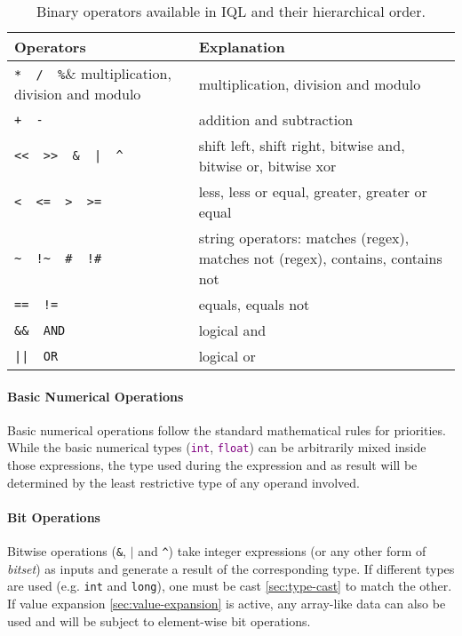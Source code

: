\documentclass[11pt,a4paper,portrait]{article}
\newcommand{\iql}{IQL\xspace}
\newcommand{\keyword}[1]{\textcolor{purple}{\texttt{#1}}}
\begin{document}
\begin{table}[ht]
\centering\begin{tabular}{|p{}|p{}|}
\hline 
Operators	& Explanation \\ 
\hline 
\hline
\verb|*  /  %|& multiplication, division and modulo \\ 
\hline 
\verb|+  -|& addition and subtraction \\ 
\hline 
\verb#<<  >>  &  |  ^#& shift left, shift right, bitwise and, bitwise or, bitwise xor \\ 
\hline 
\verb|<  <=  >  >=|& less, less or equal, greater, greater or equal \\ 
\hline 
\verb|~  !~  #  !#|& string operators: matches (regex), matches not (regex), contains, contains not \\ 
\hline 
\verb|==  !=|& equals, equals not \\ 
\hline 
\verb|&&  AND|& logical and \\ 
\hline 
\verb#||  OR#& logical or \\ 
\hline 
\end{tabular} 
\caption{Binary operators available in \iql and their hierarchical order.}
\label{tab:binary-operators}
\end{table}

\paragraph{Basic Numerical Operations}
\label{sec:basic-numerical-operations}

Basic numerical operations follow the standard mathematical rules for priorities.
While the basic numerical types (\keyword{int}, \keyword{float}) can be arbitrarily mixed inside those expressions, the type used during the expression and as result will be determined by the least restrictive type of any operand involved.

\paragraph{Bit Operations}
\label{sec:bit-operations}

Bitwise operations (\texttt{\&}, \texttt{$|$} and \texttt{\textasciicircum}) take integer expressions (or any other form of \textit{bitset}) as inputs and generate a result of the corresponding type. If different types are used (e.g. \texttt{int} and \texttt{long}), one must be cast \ref{sec:type-cast} to match the other. If value expansion \ref{sec:value-expansion} is active, any array-like data can also be used and will be subject to element-wise bit operations.
\end{document}
